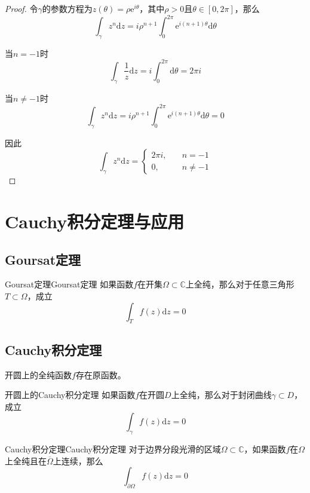 \documentclass[lang = cn, scheme = chinese, thmcnt = section]{elegantbook}
\newcommand{\C}{\mathbb{C}}  		   %
\newcommand{\sub}{\subset}             %
\newcommand{\dd}{\mathrm{d}}           %
\begin{document}
\begin{proof}
	令$\gamma$的参数方程为$z(\theta)=\rho\mathrm{e}^{i\theta}$，其中$\rho>0$且$\theta\in[0,2\pi]$，那么
	$$
	\int_{\gamma}{z^n\mathrm{d}z}=i\rho^{n+1}\int_{0}^{2\pi}{\mathrm{e}^{i(n+1)\theta}\mathrm{d}\theta}
	$$
	
	当$n=-1$时
	$$
	\int_{\gamma}{\frac{1}{z}\mathrm{d}z}=i\int_{0}^{2\pi}{\mathrm{d}\theta}=2\pi i
	$$
	
	当$n\ne-1$时
	$$
	\int_{\gamma}{z^n\mathrm{d}z}=i\rho^{n+1}\int_{0}^{2\pi}{\mathrm{e}^{i(n+1)\theta}\mathrm{d}\theta}=0
	$$
	
	因此
	$$
	\int_{\gamma}{z^n\mathrm{d}z}=\begin{cases}
		2\pi i,\quad & n=-1\\
		0,\quad & n\ne-1
	\end{cases}
	$$
\end{proof}

\chapter{Cauchy积分定理与应用}

\section{Goursat定理}

\begin{theorem}{Goursat定理}{Goursat定理}
	如果函数$f$在开集$\Omega\sub\C$上全纯，那么对于任意三角形$T\sub\Omega$，成立%
	$$
	\int_{T}f(z)\dd z=0
	$$
\end{theorem}

\section{Cauchy积分定理}

\begin{theorem}
	开圆上的全纯函数$f$存在原函数。
\end{theorem}

\begin{theorem}{开圆上的Cauchy积分定理}
	如果函数$f$在开圆$D$上全纯，那么对于封闭曲线$\gamma\sub D$，成立
	$$
	\int_{\gamma}{f(z)\mathrm{d}z}=0
	$$
\end{theorem}

\begin{theorem}{Cauchy积分定理}{Cauchy积分定理}
	对于边界分段光滑的区域$\Omega\sub\C$，如果函数$f$在$\Omega$上全纯且在$\overline{\Omega}$上连续，那么%
	$$
	\int_{\partial\Omega}f(z)\dd z=0
	$$
\end{theorem}
\end{document}
